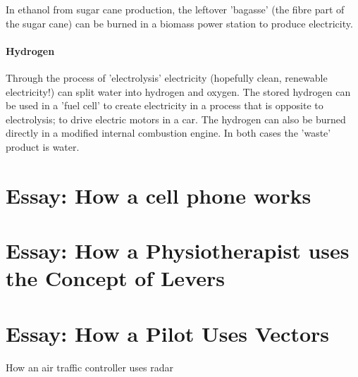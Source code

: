 In ethanol from sugar cane production, the leftover 'bagasse' (the
fibre part of the sugar cane) can be burned in a biomass power
station to produce electricity.

\subsubsection*{Hydrogen} Through the process of 'electrolysis'
electricity (hopefully clean, renewable electricity!) can split
water into hydrogen and oxygen. The stored hydrogen can be used in a
'fuel cell' to create electricity in a process that is opposite to
electrolysis; to drive electric motors in a car. The hydrogen can also be burned directly in a modified internal combustion engine. In both cases the 'waste' product is water.







\chapter{Essay: How a cell phone works}





\chapter{Essay: How a Physiotherapist uses the Concept of Levers}







\chapter{Essay: How a Pilot Uses Vectors}





How an air traffic controller uses radar





